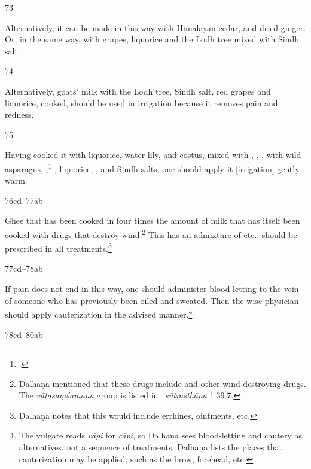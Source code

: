 \begin{translation}
    \item[73]
    
    Alternatively, it can be made in this way with Himalayan cedar,  and dried 
    ginger.
    Or, in the same way, with grapes, liquorice and the Lodh tree mixed with Sindh salt.
    
    \item[74]
    
    Alternatively, goats' milk with the Lodh tree, Sindh salt, red grapes and liquorice, cooked, 
    should be used in irrigation because it removes pain and redness. 
    
    \item[75]
    
    Having cooked it with liquorice, water-lily, and costus, mixed with ,
    ,
    , 
    with wild asparagus, ,\footcite[18]{suve-2000}
    ,
    liquorice,
    ,
    and Sindh salts, 
    one should apply it [irrigation] gently warm.
    
    
    \item[76cd--77ab]
    
    Ghee that has been cooked in four times the amount of milk that has itself
been cooked with drugs that destroy wind.\footnote{Ḍalhaṇa mentioned that these
drugs include  and other wind-destroying drugs.  The
\emph{vātasaṃśamana} group is listed in \SS\ \emph{sūtrasthāna} 1.39.7.}
This has an admixture of  etc., should be
prescribed in all treatments.\footnote{Ḍalhaṇa notes that this would include
errhines, ointments, etc.}
    
    \item[77cd--78ab]
    
    If pain does not end in this way, one should administer blood-letting to the vein of 
    someone who has previously been oiled and sweated.  Then the wise physician should 
    apply cauterization in the advised manner.\footnote{The vulgate reads \emph{vāpi} for 
    \emph{cāpi}, so Ḍalhaṇa sees blood-letting and cautery as alternatives, not a sequence of 
    treatments.  Ḍalhaṇa lists the places that cauterization may be applied, such as  the brow, 
    forehead, etc.}
    
    \item[78cd--80ab]
    

\end{translation}
